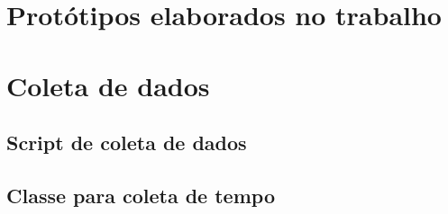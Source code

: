 \begin{apendicesenv}

\partapendices

\chapter{Protótipos elaborados no trabalho}
\label{apendice}

 









\chapter{Coleta de dados} %
\label{cha:coleta_de_dados}

\section{Script de coleta de dados}
	

\section{Classe para coleta de tempo}
	



\end{apendicesenv}
